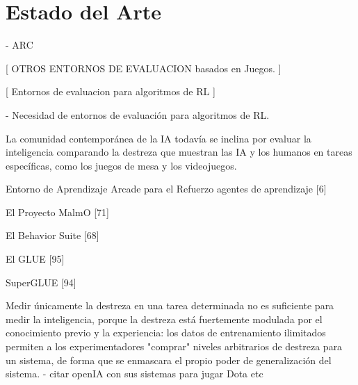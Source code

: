 \chapter{Estado del Arte}\label{chapter:state-of-the-art}

- ARC

[ OTROS ENTORNOS DE EVALUACION basados en Juegos. ]

[ Entornos de evaluacion para algoritmos de RL ]

- Necesidad de entornos de evaluación para algoritmos de RL.

La comunidad contemporánea de la IA todavía se inclina por evaluar la inteligencia comparando la destreza que muestran las IA y los humanos en tareas específicas, como los juegos de mesa y los videojuegos.


Entorno de Aprendizaje Arcade para el Refuerzo
agentes de aprendizaje [6]

El Proyecto MalmO [71]

El Behavior Suite [68]

El GLUE [95]

SuperGLUE [94] 


Medir únicamente la destreza en una tarea determinada no es suficiente para medir la inteligencia, porque la destreza está fuertemente modulada por el conocimiento previo y la experiencia: los datos de entrenamiento ilimitados permiten a los experimentadores "comprar" niveles arbitrarios de destreza para un sistema, de forma que se enmascara el propio poder de generalización del sistema.
- citar openIA con sus sistemas para jugar Dota etc